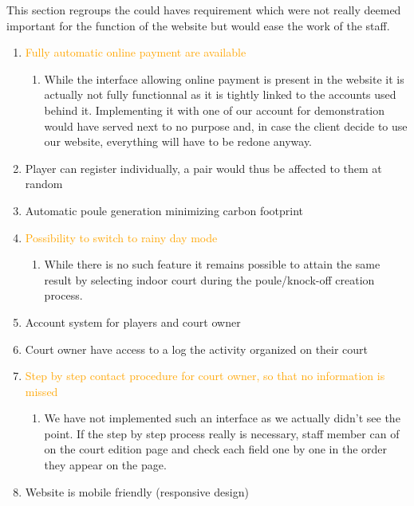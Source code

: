 This section regroups the could haves requirement which were not really deemed important
for the function of the website but would ease the work of the staff.\newline

\begin{enumerate} \itemsep1pt
\item \textcolor{orange} {Fully automatic online payment are available}
	\begin{enumerate} \itemsep1pt
	\item While the interface allowing online payment is present in the website
	 it is actually not fully functionnal as it is tightly linked to the accounts
	  used behind it. Implementing it with one of our account for demonstration would
	   have served next to no purpose and, in case the client decide to use our 
	   website, everything will have to be redone anyway.
	\end{enumerate}
\item \textcolor{green!60!black} {Player can register individually, a pair would thus be affected to them at random}
\item \textcolor{green!60!black} {Automatic poule generation minimizing carbon footprint}
\item \textcolor{orange} {Possibility to switch to rainy day mode}
	\begin{enumerate} \itemsep1pt
	\item While there is no such feature it remains possible to attain the same result
	by selecting indoor court during the poule/knock-off creation process.
	\end{enumerate}
\item \textcolor{green!60!black} {Account system for players and court owner}
\item \textcolor{green!60!black} {Court owner have access to a log the activity 
organized on their court}
\item \textcolor{orange} {Step by step contact procedure for court owner, 
so that no information is missed}
	\begin{enumerate} \itemsep1pt
	\item We have not implemented such an interface as we actually didn't see the point.
	If the step by step process really is necessary, staff member can of on the court
	edition page and check each field one by one in the order they appear on the page. 
	\end{enumerate}
\item \textcolor{green!60!black} {Website is mobile friendly (responsive design)}
\end{enumerate}

